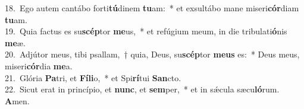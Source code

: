 {18.~}Ego autem cantábo forti\textbf{tú}dinem \textbf{tu}am:~* et exsultábo mane miseri\textbf{cór}diam \textbf{tu}am.\\
{19.~}Quia factus es su\textbf{scép}tor \textbf{me}us,~* et refúgium meum, in die tribulati\textbf{ó}nis \textbf{me}æ.\\
{20.~}Adjútor meus, tibi psallam,~† quia, Deus, su\textbf{scép}tor \textbf{me}\textbf{us} es:~* Deus meus, miseri\textbf{cór}dia \textbf{me}a.\\
{21.~}Glória \textbf{Pa}tri, et \textbf{Fí}\textbf{li}o,~* et Spi\textbf{rí}tui \textbf{San}cto.\\
{22.~}Sicut erat in princípio, et \textbf{nunc}, et \textbf{sem}per,~* et in sǽcula sæcu\textbf{ló}rum. \textbf{A}men.\\
